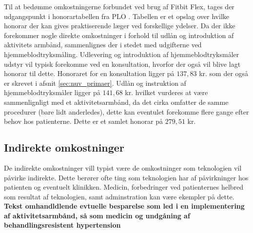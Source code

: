 Til at bedømme omkostningerne forbundet ved brug af Fitbit Flex, tages der udgangspunkt i honorartabellen fra PLO \citep{honorartabel2016}. Tabellen er et opslag over hvilke honorar der kan gives praktiserende læger ved forskellige ydelser.
Da der ikke forekommer nogle direkte omkostninger i forhold til udlån og introduktion af aktivitets armbånd, sammenlignes der i stedet med udgifterne ved hjemmeblodtryksmåling. Udlevering og introduktion af hjemmeblodtryksmåler udstyr vil typisk forekomme ved en konsultation, hvorfor der også vil blive lagt honorar til dette. Honoraret for en konsultation ligger på $137,83$ kr. som der også er skrevet i afsnit \autoref{sec:nuv_primaer}. Udlån og instruktion af hjemmeblodtryksmåler ligger på $141,68$ kr. hvilket vurderes at være sammenlignligt med et aktivitetsarmbånd, da det cirka omfatter de samme procedurer (bare lidt anderledes), dette kan eventulet forekomme flere gange efter behov hos patienterne. Dette er et samlet honorar på $279,51$ kr.

\subsection{Indirekte omkostninger}
De indirekte omkostninger vill typist være de omkostninger som teknologien vil påvirke indirekte. Dette berører ofte ting som teknologien har af påvirkninger hos patienten og eventuelt klinikken. Medicin, forbedringer ved patienternes helbred som resultat af teknologien, samt adminstration kan være ekempler på dette. 
\textbf{Tekst omhandldlende evtuelle besparelse som led i en implementering af aktivitetsarmbånd, så som medicin og undgåning af behandlingsresistent hypertension}













\begin{comment}
Hvad koster et Fitbit Flex? 
Hvilke besparelser tilbydes der så sundhedsektoren? 

Hvad koster det så at introducere patienterne til teknologien? 
	Hvad dækker den her introduktion minimum over, for at kunne anvende armbåndet? (Anvendelse af app og hvordan den skal oplades.)
	
Hvad koster det hvis de har spørgsmål vedr. teknologien? 


Langsigtet omkostninger - hvis behandlingen hjælper/ikke hjælper
- Besparelser vedr. medicinering 
- Besparelser vedr. ambulant forløb 
- Forebyggelse af behandlingsresistent hypertension = $$$$



EVT: Dags-takster i sekundær sektor (Ambulant).



En model i almen praktsis for implementeringen af aktivitetsarmbånd?

Honorartabel = \citep{honorartabel2016}
\end{comment}